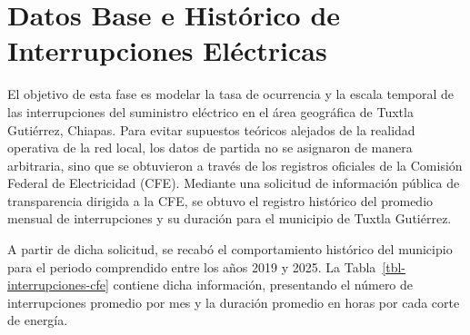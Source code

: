 \documentclass[
  spanish,
  us-letterpaper,
]{scrreprt}
\numberwithin{equation}{section}
\theoremstyle{plain}
\theoremstyle{plain}
\theoremstyle{definition}
\theoremstyle{plain}
\theoremstyle{remark}
\begin{document}
\section{Datos Base e Histórico de Interrupciones
Eléctricas}\label{sec-datos-cfe}

El objetivo de esta fase es modelar la tasa de ocurrencia y la escala
temporal de las interrupciones del suministro eléctrico en el área
geográfica de Tuxtla Gutiérrez, Chiapas. Para evitar supuestos teóricos
alejados de la realidad operativa de la red local, los datos de partida
no se asignaron de manera arbitraria, sino que se obtuvieron a través de
los registros oficiales de la Comisión Federal de Electricidad (CFE).
Mediante una solicitud de información pública de transparencia dirigida
a la CFE, se obtuvo el registro histórico del promedio mensual de
interrupciones y su duración para el municipio de Tuxtla Gutiérrez.

A partir de dicha solicitud, se recabó el comportamiento histórico del
municipio para el periodo comprendido entre los años 2019 y 2025. La
Tabla~\ref{tbl-interrupciones-cfe} contiene dicha información,
presentando el número de interrupciones promedio por mes y la duración
promedio en horas por cada corte de energía.
\end{document}
